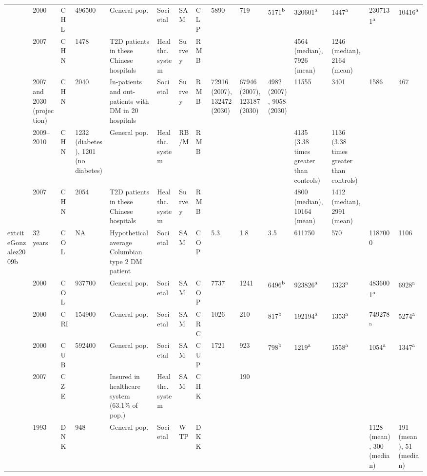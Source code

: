 \documentclass[12pt,english]{article}
\begin{document}
\begin{appendix}
\begin{landscape}
\begin{tabularx}{\linewidth}{Z X X Z Z X X X X X X X X Y Y}
\textcite{Barcelo2003} & 2000 & CHL & 496500 & General pop. & Societal & SAM & CLP & 5890 & 719 & 5171\textsuperscript{b} & 320601\textsuperscript{a} & 1447\textsuperscript{a} & 2307131\textsuperscript{a} & 10416\textsuperscript{a} \\
\textcite{Wang2010c} & 2007 & CHN & 1478 & T2D patients in these Chinese hospitals & Healthc. system & Survey & RMB &  &  &  & 4564 (median), 7926 (mean) & 1246 (median), 2164 (mean) &  &  \\
\textcite{Wang2009f} & 2007 and 2030 (projection) & CHN & 2040 & In-patients and out-patients with DM in 20   hospitals & Societal & Survey & RMB & 72916 (2007), 132472 (2030) & 67946 (2007), 123187 (2030) & 4982 (2007), 9058 (2030) & 11555 & 3401 & 1586 & 467 \\
\textcite{Yang2012} & 2009--2010 & CHN & 1232 (diabetes), 1201 (no diabetes) & General pop. & Healthc. system & RB/M & RMB &  &  &  & 4135 (3.38 times greater than controls) & 1136 (3.38 times greater than controls) &  &  \\
\textcite{Wang2009b} & 2007 & CHN & 2054 & T2D patients in these Chinese hospitals & Healthc. system & Survey & RMB &  &  &  & 4800 (median), 10164 (mean) & 1412 (median), 2991 (mean) &  &  \\
	extcite{Gonzalez2009b} & 32 years & COL & NA & Hypothetical average Columbian type 2 DM   patient & Societal & SAM & COP & 5.3 & 1.8 & 3.5 & 611750 & 570 & 1187000 & 1106 \\
\textcite{Barcelo2003} & 2000 & COL & 937700 & General pop. & Societal & SAM & COP & 7737 & 1241 & 6496\textsuperscript{b} & 923826\textsuperscript{a} & 1323\textsuperscript{a} & 4836001\textsuperscript{a} & 6928\textsuperscript{a} \\
\textcite{Barcelo2003} & 2000 & CRI & 154900 & General pop. & Societal & SAM & CRC & 1026 & 210 & 817\textsuperscript{b} & 192194\textsuperscript{a} & 1353\textsuperscript{a} & 749278\textsuperscript{a} & 5274\textsuperscript{a} \\
\textcite{Barcelo2003} & 2000 & CUB & 592400 & General pop. & Societal & SAM & CUP & 1721 & 923 & 798\textsuperscript{b} & 1219\textsuperscript{a} & 1558\textsuperscript{a} & 1054\textsuperscript{a} & 1347\textsuperscript{a} \\
\textcite{Horak2009} & 2007 & CZE &  & Insured in healthcare system (63.1\% of   pop.) & Healthc. system & SAM & CHK &  & 190 &  &  &  &  &  \\
\textcite{Gyldmark2001} & 1993 & DNK & 948 & General pop. & Societal & \ac{WTP} & DKK &  &  &  &  &  & 1128 (mean), 300 (median) & 191 (mean), 51 (median) \\

\end{tabularx}
\end{landscape}
\end{appendix}
\end{document}
